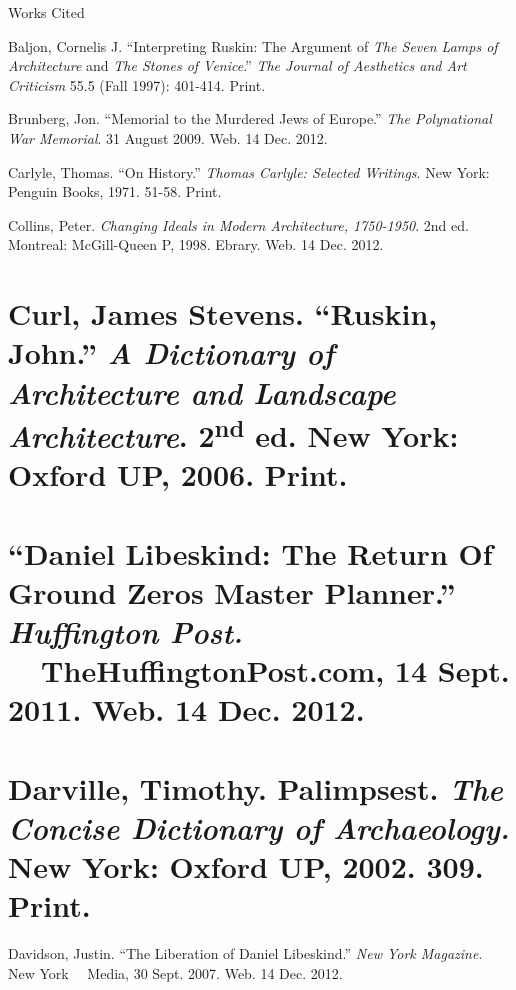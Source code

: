 \bigskip


\bigskip

{\centering\color{black}
Works Cited
\par}

{\color{black}
Baljon, Cornelis J.  “Interpreting Ruskin: The Argument of \textit{The
Seven Lamps of Architecture} and \textit{The Stones of Venice}.” 
\textit{The Journal of Aesthetics and Art Criticism} 55.5 (Fall 1997):
401-414.  Print.  }

{\color{black}
Brunberg, Jon.  “Memorial to the Murdered Jews of Europe.”  \textit{The
Polynational War Memorial}.  31 August 2009.  Web.  14 Dec. 2012.  }

{\color{black}
Carlyle, Thomas.  “On History.”  \textit{Thomas Carlyle: Selected
Writings}.  New York: Penguin Books, 1971.  51-58.  Print.}

{\color{black}
Collins, Peter.  \textit{Changing Ideals in Modern Architecture,
1750-1950}.  2nd ed.  Montreal: McGill-Queen P, 1998.  Ebrary.  Web. 
14 Dec. 2012.}

\section[Curl, James Stevens. \ “Ruskin, John.” \ A Dictionary of
Architecture and Landscape Architecture. \ 2nd ed. \ New York: Oxford
UP, 2006. \ Print. \ ]{\textmd{Curl, James Stevens.  “Ruskin, John.” 
}\textmd{\textit{A Dictionary of Architecture and Landscape
Architecture}}\textmd{.  2}\textmd{\textsuperscript{nd}}\textmd{ ed. 
New York: Oxford UP, 2006.  Print.  }}
\section[“Daniel Libeskind: The Return Of Ground Zero{\textquotesingle}s
Master Planner.” \ Huffington Post. \ \ \ TheHuffingtonPost.com, 14
Sept. 2011. \ Web. \ 14 Dec. 2012. \ ]{\textmd{“Daniel Libeskind: The
Return Of Ground Zero{\textquotesingle}s Master Planner.” 
}\textmd{\textit{Huffington Post.  \ \ }}\textmd{TheHuffingtonPost.com,
14 Sept. 2011.  Web.  14 Dec. 2012.  }}
\section[Darville, Timothy. \ {\textquotedbl}Palimpsest.{\textquotedbl}
\ The Concise Dictionary of Archaeology. \ New York: Oxford UP, 2002.
\ 309. \ Print.]{\textmd{Darville, Timothy. 
{\textquotedbl}Palimpsest.{\textquotedbl}  }\textmd{\textit{The Concise
Dictionary of Archaeology.  }}\textmd{New York: Oxford UP, 2002.  309. 
Print.}}
{\color{black}
Davidson, Justin.  “The Liberation of Daniel Libeskind.”  \textit{New
York Magazine}.  New York \ \ Media, 30 Sept. 2007.  Web.  14 Dec.
2012.  }

